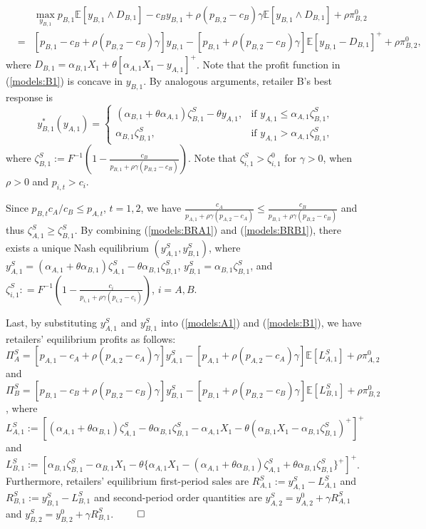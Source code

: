 \documentclass[nonblindrev,copyedit]{informs1}
\begin{document}
\begin{APPENDICES}
\begin{eqnarray}
    & & \max_{y_{B,1}}  p_{B,1} \mathbb{E}\left[y_{B,1} \wedge D_{B,1}  \right] - c_B y_{B,1} + \rho (p_{B,2} -c_B)\gamma \mathbb{E} \left[y_{B,1} \wedge D_{B,1}  \right] + \rho \pi^{0}_{B,2} \nonumber \\
    & = & [p_{B,1} -c_B + \rho (p_{B,2} -c_B)\gamma]y_{B,1} - [p_{B,1}+\rho (p_{B,2} -c_B)\gamma] \mathbb{E} \left[y_{B,1} - D_{B,1}  \right]^+ + \rho \pi^{0}_{B,2}, \label{models:B1}
\end{eqnarray}
where $D_{B,1} = \alpha_{B,1} X_1 + \theta \left[\alpha_{A,1} X_1 - y_{A,1} \right]^+$. Note that the profit function in (\ref{models:B1}) is concave in $y_{B,1}$. By analogous arguments, retailer B's best response is
\begin{equation}  \label{models:BRB1}
    y^*_{B,1}(y_{A,1}) =  \begin{cases}
        (\alpha_{B,1} + \theta \alpha_{A,1}) \zeta^S_{B,1} - \theta y_{A,1}, &  \text{if $y_{A,1} \leq \alpha_{A,1} \zeta^S_{B,1}$,} \\
        \alpha_{B,1} \zeta^S_{B,1}, &  \text{if $y_{A,1} > \alpha_{A,1} \zeta^S_{B,1}$,}
    \end{cases}
\end{equation}
where $\zeta^S_{B,1} := F^{-1}(1 - \frac{c_B}{p_{B,1}+\rho \gamma (p_{B,2}-c_B)})$. Note that $\zeta^S_{i,1} > \zeta^0_{i,1}$ for $\gamma > 0$, when $\rho >0$ and $p_{i,t}>c_i$.

Since $p_{B,t} c_A/c_B \leq p_{A,t}$, $t= 1,2$, we have $\frac{c_A}{p_{A,1}+\rho \gamma (p_{A,2}-c_A)} \leq \frac{c_B}{p_{B,1}+\rho \gamma (p_{B,2}-c_B)}$ and thus $\zeta^S_{A,1} \geq \zeta^S_{B,1}$. By combining (\ref{models:BRA1}) and (\ref{models:BRB1}), there exists a unique Nash equilibrium $(y^S_{A,1},y^S_{B,1})$, where $y^S_{A,1} = (\alpha_{A,1} + \theta \alpha_{B,1}) \zeta^S_{A,1} - \theta \alpha_{B,1} \zeta^S_{B,1}$, $y^S_{B,1} = \alpha_{B,1} \zeta^S_{B,1}$, and $\zeta^S_{i,1} : =F^{-1}(1 - \frac{c_i}{p_{i,1}+\rho \gamma (p_{i,2}-c_i)})$, $i = A, B$.

Last, by substituting $y^S_{A,1}$ and $y^S_{B,1}$ into (\ref{models:A1}) and (\ref{models:B1}), we have retailers' equilibrium profits as follows: $\Pi^{S}_{A} = [p_{A,1} -c_A + \rho (p_{A,2} -c_A)\gamma] y^S_{A,1} - [p_{A,1}+\rho (p_{A,2} -c_A)\gamma] \mathbb{E} [L^S_{A,1}] + \rho \pi^{0}_{A,2} $ and $\Pi^{S}_{B} = [p_{B,1} -c_B + \rho (p_{B,2} -c_B)\gamma] y^S_{B,1} - [p_{B,1}+\rho (p_{B,2} -c_B)\gamma] \mathbb{E}[L^S_{B,1}] + \rho \pi^{0}_{B,2}$, where $L^S_{A,1} :=  [(\alpha_{A,1}+\theta \alpha_{B,1})\zeta^S_{A,1} - \theta \alpha_{B,1} \zeta^S_{B,1} - \alpha_{A,1} X_1 - \theta (\alpha_{B,1} X_1 - \alpha_{B,1} \zeta^S_{B,1})^+ ]^+ $ and $L^S_{B,1} := [\alpha_{B,1} \zeta^S_{B,1} - \alpha_{B,1} X_1 - \theta \{\alpha_{A,1} X_1 - (\alpha_{A,1} + \theta \alpha_{B,1})\zeta^S_{A,1} +\theta \alpha_{B,1} \zeta^S_{B,1} \}^+ ]^+$. Furthermore, retailers' equilibrium first-period sales are $R^{S}_{A,1} := y^S_{A,1} - L^S_{A,1}$ and $R^{S}_{B,1} := y^S_{B,1} - L^S_{B,1}$ and second-period order quantities are $y^{S}_{A,2} = y_{A,2}^0 + \gamma R_{A,1}^S$ and $y^{S}_{B,2} = y_{B,2}^0 +  \gamma R_{B,1}^S$. $\qed$


\end{APPENDICES}
\end{document}
